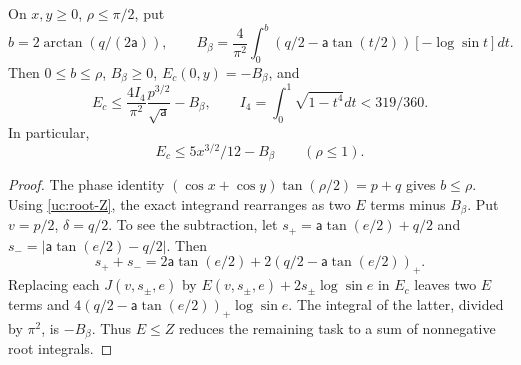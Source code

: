 \begin{lemma}\label{uc:central-pair}
On $x,y\geq0$, $\rho\leq\pi/2$, put
\[
 b=2\arctan(q/(2\mathsf a)),\qquad
 B_\beta=\frac4{\pi^2}\int_0^b
       (q/2-\mathsf a\tan(t/2))[-\log\sin t]dt.
\]
Then $0\leq b\leq\rho$, $B_\beta\geq0$, $E_c(0,y)=-B_\beta$, and
\begin{equation}\label{uc:central-pair-general}
 E_c\leq\frac{4I_4}{\pi^2}\frac{p^{3/2}}{\sqrt{\mathsf a}}-B_\beta,
 \qquad I_4=\int_0^1\sqrt{1-t^4}dt<319/360.
\end{equation}
In particular,
\begin{equation}\label{uc:central-pair-bounds}
 E_c\leq5x^{3/2}/12-B_\beta\qquad(\rho\leq1).
\end{equation}
\end{lemma}
\begin{proof}
The phase identity $(\cos x+\cos y)\tan(\rho/2)=p+q$ gives
$b\leq\rho$. Using \eqref{uc:root-Z}, the exact integrand rearranges
as two $E$ terms minus $B_\beta$. Put $v=p/2$, $\delta=q/2$.
To see the subtraction, let $s_+=\mathsf{a}\tan(e/2)+q/2$ and
$s_-=|\mathsf{a}\tan(e/2)-q/2|$. Then
\[
 s_++s_-=2\mathsf{a}\tan(e/2)+2(q/2-\mathsf{a}\tan(e/2))_+.
\]
Replacing each $J(v,s_\pm,e)$ by
$E(v,s_\pm,e)+2s_\pm\log\sin e$ in $E_c$ leaves two $E$
terms and $4(q/2-\mathsf{a}\tan(e/2))_+\log\sin e$. The integral of
the latter, divided by $\pi^2$, is $-B_\beta$. Thus $E\leq Z$
reduces the remaining task to a sum of nonnegative root integrals.


\end{proof}
